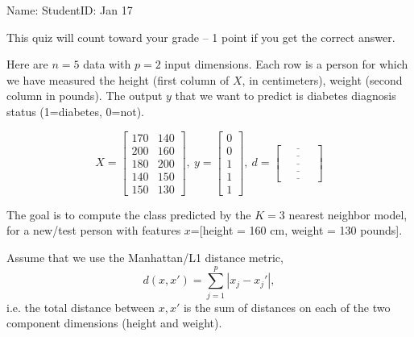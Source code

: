 \documentclass{article}
\begin{document}
\thispagestyle{empty}

Name: \underline{\hspace{2in}} StudentID: \underline{\hspace{2in}} Jan 17 

This quiz will count toward your grade -- 1 point if you get the
correct answer.

Here are $n=5$ data with $p=2$ input dimensions. Each row is a person
for which we have measured the height (first column of $X$, in
centimeters), weight (second column in pounds). The output $y$ that we
want to predict is diabetes diagnosis status (1=diabetes, 0=not).

\begin{equation*}
  X = \left[\begin{array}{cc}
              170 & 140 \\
              200 & 160 \\
              180 & 200 \\
              140 & 150 \\
              150 & 130
\end{array}\right],\ 
  y = \left[\begin{array}{c}
              0 \\
              0 \\
              1 \\
              1 \\
              1
\end{array}\right],\ 
  d = \left[\begin{array}{c}
              \underline{\hspace{1cm}}\\
              \underline{\hspace{1cm}}\\
              \underline{\hspace{1cm}}\\
              \underline{\hspace{1cm}}\\
              \underline{\hspace{1cm}}
\end{array}\right]
\end{equation*}

The goal is to compute the class predicted by the $K=3$ nearest
neighbor model, for a new/test person with features $x$=[height = 160 cm,
weight = 130 pounds].

Assume that we use the Manhattan/L1 distance metric, 
\begin{equation*}
  d(x,x') = \sum_{j=1}^p |x_j-x_j'|,
\end{equation*}
i.e. the total distance between $x,x'$ is the sum of distances on each
of the two component dimensions (height and weight).
\end{document}
